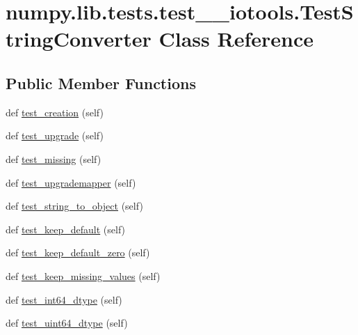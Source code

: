 \hypertarget{classnumpy_1_1lib_1_1tests_1_1test____iotools_1_1TestStringConverter}{}\section{numpy.\+lib.\+tests.\+test\+\_\+\+\_\+iotools.\+Test\+String\+Converter Class Reference}
\label{classnumpy_1_1lib_1_1tests_1_1test____iotools_1_1TestStringConverter}
\subsection*{Public Member Functions}
\begin{DoxyCompactItemize}
\item 
def \hyperlink{classnumpy_1_1lib_1_1tests_1_1test____iotools_1_1TestStringConverter_a039b71c64f5fb6e8725203603483c749}{test\+\_\+creation} (self)
\item 
def \hyperlink{classnumpy_1_1lib_1_1tests_1_1test____iotools_1_1TestStringConverter_a421cb4a40f18fdf2da4fc3c914f31672}{test\+\_\+upgrade} (self)
\item 
def \hyperlink{classnumpy_1_1lib_1_1tests_1_1test____iotools_1_1TestStringConverter_a0c8bd3def50a612ec4b00151ebfbd18a}{test\+\_\+missing} (self)
\item 
def \hyperlink{classnumpy_1_1lib_1_1tests_1_1test____iotools_1_1TestStringConverter_a0abeea0ed1a2f8913a3ff0b0396bfc0a}{test\+\_\+upgrademapper} (self)
\item 
def \hyperlink{classnumpy_1_1lib_1_1tests_1_1test____iotools_1_1TestStringConverter_a1ca164a1bed9a0e5b90642377c7b3a4d}{test\+\_\+string\+\_\+to\+\_\+object} (self)
\item 
def \hyperlink{classnumpy_1_1lib_1_1tests_1_1test____iotools_1_1TestStringConverter_a69afc66561d09070e925db4968faf4a4}{test\+\_\+keep\+\_\+default} (self)
\item 
def \hyperlink{classnumpy_1_1lib_1_1tests_1_1test____iotools_1_1TestStringConverter_ac2351c4345a5b7f31b41316f35ee597a}{test\+\_\+keep\+\_\+default\+\_\+zero} (self)
\item 
def \hyperlink{classnumpy_1_1lib_1_1tests_1_1test____iotools_1_1TestStringConverter_a70ab5ba87d9393562b6ff034de39208a}{test\+\_\+keep\+\_\+missing\+\_\+values} (self)
\item 
def \hyperlink{classnumpy_1_1lib_1_1tests_1_1test____iotools_1_1TestStringConverter_a0f2fdb9789fae559a127f38657536478}{test\+\_\+int64\+\_\+dtype} (self)
\item 
def \hyperlink{classnumpy_1_1lib_1_1tests_1_1test____iotools_1_1TestStringConverter_afc361ed0831c374d203471380f9ab0c8}{test\+\_\+uint64\+\_\+dtype} (self)
\end{DoxyCompactItemize}


